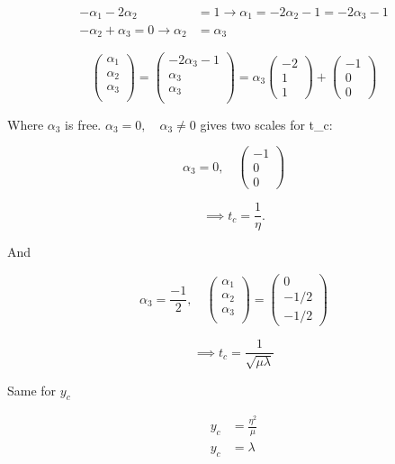 \documentclass[12pt]{article}
\begin{document}
\begin{equation}
  \begin{aligned}
    -\alpha_1-2\alpha_2 &= 1 \rightarrow \alpha_1=-2\alpha_2-1=-2\alpha_3-1\\
    -\alpha_2 + \alpha_3 = 0 \rightarrow \alpha_2&=\alpha_3
  \end{aligned}
\end{equation}

\begin{equation}
  \begin{pmatrix}
    \alpha_1 \\ \alpha_2 \\\alpha_3 \\
  \end{pmatrix}
  =
  \begin{pmatrix}
    -2\alpha_3-1 \\ \alpha_3 \\\alpha_3 \\
  \end{pmatrix}
  = \alpha_3
  \begin{pmatrix}
    -2 \\ 1 \\ 1
  \end{pmatrix}
  +
  \begin{pmatrix}
    -1 \\ 0 \\ 0
  \end{pmatrix}
\end{equation}

Where $\alpha_3$ is free. $\alpha_3=0, \quad \alpha_3\ne0$ gives two scales for
t\_c:

\begin{equation}
  \alpha_3=0, \quad
  \begin{pmatrix}
    -1 \\ 0 \\ 0
  \end{pmatrix}
\end{equation}

\begin{equation}
  \implies t_c = \frac{1}{\eta}.
\end{equation}

And

\begin{equation}
  \alpha_3 = \frac{-1}{2}, \quad
  \begin{pmatrix}
    \alpha_1 \\ \alpha_2 \\ \alpha_3 \\
  \end{pmatrix}
  =
  \begin{pmatrix}
    0 \\ -1/2 \\ -1/2
  \end{pmatrix}
\end{equation}

\begin{equation}
  \implies t_c = \frac{1}{\sqrt{\mu\lambda}}
\end{equation}

Same for $y_c$

\begin{equation}
  \begin{aligned}
    y_c &= \frac{\eta^2}{\mu} \\
    y_c &= \lambda
  \end{aligned}
\end{equation}
\end{document}
